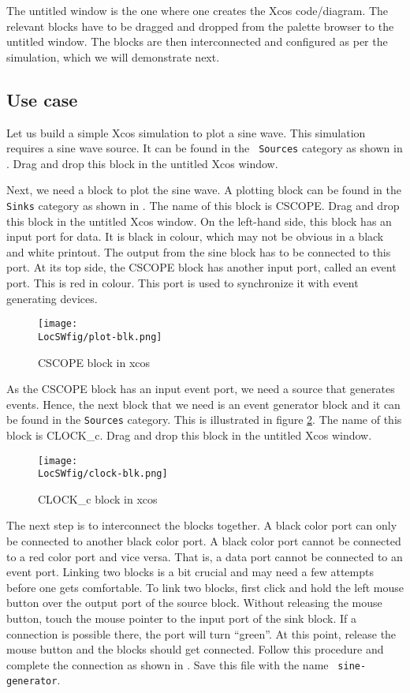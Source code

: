 The untitled window is the one where one creates the Xcos
code/diagram. The relevant blocks have to be dragged and dropped from
the palette browser to the untitled window. The blocks are then
interconnected and configured as per the simulation, which we will
demonstrate next.

\subsection{Use case}
Let us build a simple Xcos simulation to plot a sine wave. This
simulation requires a sine wave source. It can be found in the {\tt
            Sources} category as shown in . Drag and drop this
block in the untitled Xcos window. 

Next, we need a block to plot the sine wave. A plotting block can be
found in the {\tt Sinks} category as shown in . The
name of this block is CSCOPE. Drag and drop this block in the untitled
Xcos window.  On the left-hand side, this block has an input port for
data.  It is black in colour, which may not be obvious in a black and
white printout.  The output from the sine block has to be connected
to this port.  At its top side, the CSCOPE block has another input
port, called an event port.  This is red in colour.  This port is used
to synchronize it with event generating devices.

\begin{figure}
      \centering
      \texttt{[image: \\LocSWfig/plot-blk.png]}
      \caption{CSCOPE block in xcos}
      \label{plot-blk}
\end{figure}

As the CSCOPE block has an
input event port, we need a source that generates events. Hence, the
next block that we need is an event generator block and it can be
found in the {\tt Sources} category. This is illustrated in figure
\ref{clk-blk}. The name of this block is CLOCK\_c. Drag and drop this
block in the untitled Xcos window.

\begin{figure}
      \centering
      \texttt{[image: \\LocSWfig/clock-blk.png]}
      \caption{CLOCK\_c block in xcos}
      \label{clk-blk}
\end{figure}

The next step is to interconnect the blocks together. A black color
port can only be connected to another black color port. A black color
port cannot be connected to a red color port and vice versa.  That is,
a data port cannot be connected to an event port.  Linking
two blocks is a bit crucial and may need a few attempts before one gets
comfortable. To link two blocks, first click and hold the left mouse
button over the output port of the source block. Without releasing the
mouse button, touch the mouse pointer to the input port of the sink
block. If a connection is possible there, the port will turn
``green''. At this point, release the mouse button and the blocks should
get connected. Follow this procedure and complete the connection as
shown in .  Save this file with the name {\tt
            sine-generator}.  

